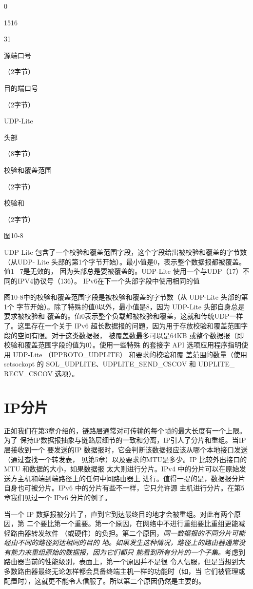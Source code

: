 0

1516

31

源端口号

（2字节）

目的端口号

（2字节）

UDP-Lite

头部

（8字节）

校验和覆盖范围

（2字节）

校验和

（2字节）

图10-8

UDP-Lite 包含了一个校验和覆盖范围字段，这个字段给出被校验和覆盖的字节数（从UDP-
Lite 头部的第1个字节开始）。最小值是0，表示整个数据报都被覆盖。值1 ~7是无效的，
因为头部总是要被覆盖的。UDP-Lite 使用一个与UDP（17）不同的IPV4协议号（136）。
IPv6在下一个头部字段中使用相同的值

图10-8中的校验和覆盖范围字段是被校验和覆盖的字节数（从 UDP-Lite 头部的第1个
字节开始）。除了特殊的值0以外，最小值是8，因为 UDP-Lite 头部自身总是要求被校验和
覆盖的。值0表示整个负载都被校验和覆盖，这就和传统UDP一样了。这里存在一个关于
IPv6 超长数据报的问题，因为用于存放校验和覆盖范围字段的空间有限。对于这类数据报，
被覆盖数最多可以是64KB 或整个数据报（即校验和覆盖范围字段的值为0）。使用一些特殊
的套接字 API 选项应用程序指明使用 UDP-Lite （IPPROTO\_UDPLITE） 和要求的校验和覆
盖范围的数量（使用 setsockopt 的 SOL\_UDPLITE、UDPLITE\_SEND\_CSCOV 和 UDPLITE\_
RECV\_CSCOV 选项）。

\section{IP分片}
正如我们在第3章介绍的，链路层通常对可传输的每个帧的最大长度有一个上限。为了
保持IP数据报抽象与链路层细节的一致和分离，IP引人了分片和重组。当IP 层接收到一个
要发送的IP 数据报时，它会判断该数据报应该从哪个本地接口发送（通过查找一个转发表，
见第5章）以及要求的MTU是多少。IP 比较外出接口的MTU 和数据的大小，如果数据报
太大则进行分片。IPv4 中的分片可以在原始发送方主机和端到端路径上的任何中间路由器上
进行。值得一提的是，数据报分片自身也可被分片。IPv6 中的分片有些不一样，它只允许源
主机进行分片。在第5章我们见过一个 IPv6 分片的例子。

当一个 IP 数据报被分片了，直到它到达最终目的地才会被重组。对此有两个原因，第
二个要比第一个重要。第一个原因，在网络中不进行重组要比重组更能减轻路由器转发软件
（或硬件）的负担。第二个原因，\emph{同一数据报的不同分片可能经由不同的路径到达相同的目的
地。如果发生这种情况，路径上的路由器通常没有能力来重组原始的数据报，因为它们都只
能看到所有分片的一个子集。}考虑到路由器当前的性能级别，表面上，第一个原因并不是很
令人信服，但是当想到大多数路由器最终无论怎样都会具备终端主机一样的功能时（如，当
它们被管理或配置时），这就更不能令人信服了。所以第二个原因仍然是主要的。

